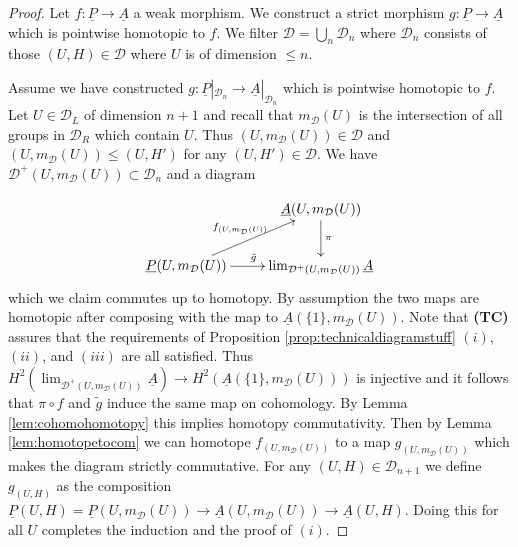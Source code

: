 \documentclass[12pt,a4paper]{article}
\theoremstyle{definition}
\begin{document}
\begin{proof}
Let $f\colon \underline{P}\rightarrow \underline{A}$ a weak morphism. We construct a strict morphism $g\colon \underline{P}\rightarrow\underline{A}$ which is pointwise homotopic to $f$.
We filter $\mathcal{D}=\bigcup_n \mathcal{D}_n$ where $\mathcal{D}_n$ consists of those $(U,H)\in \mathcal{D}$ where $U$ is of dimension $\leq n$.

Assume we have constructed $g\colon\underline{P}|_{\mathcal{D}_n}\rightarrow \underline{A}|_{\mathcal{D}_n}$ which is pointwise homotopic to $f$. Let $U\in \mathcal{D}_L$ of dimension $n+1$ and recall that $m_\mathcal{D}(U)$ is the intersection of all groups in $\mathcal{D}_R$ which contain $U$. Thus $(U,m_\mathcal{D}(U))\in \mathcal{D}$ and $(U,m_\mathcal{D}(U))\leq (U,H')$ for any $(U,H')\in \mathcal{D}$. We have $\mathcal{D}^+(U,m_\mathcal{D}(U))\subset \mathcal{D}_n$
and a diagram

\[\xymatrix{
 & \underline{A}(U,m_\mathcal{D}(U))\ar[d]^\pi\\
 \underline{P}(U,m_\mathcal{D}(U))\ar[r]^{\tilde{g}}\ar[ur]^{f_{(U,m_\mathcal{D}(U))}}&\lim_{\mathcal{D}^+(U,m_\mathcal{D}(U))}\underline{A}
}\]
 which we claim commutes up to homotopy. By assumption the two maps are homotopic after composing with the map to $\underline{A}(\{1\},m_\mathcal{D}(U))$. Note that \textbf{(TC)} assures that the requirements of Proposition \ref{prop:technicaldiagramstuff} $(i)$, $(ii)$, and $(iii)$ are all satisfied. Thus $H^2(\lim_{\mathcal{D}^+(U,m_\mathcal{D}(U))}\underline{A})\rightarrow H^2(\underline{A}(\{1\},m_\mathcal{D}(U)))$ is injective and it follows that $\pi\circ f$ and $\tilde{g}$ induce the same map on cohomology. By Lemma \ref{lem:cohomohomotopy} this implies homotopy commutativity. Then by Lemma \ref{lem:homotopetocom} we can homotope $f_{(U,m_\mathcal{D}(U))}$ to a map $g_{(U,m_\mathcal{D}(U))}$ which makes the diagram strictly commutative. For any $(U,H)\in\mathcal{D}_{n+1}$ we define $g_{(U,H)}$ as the composition $\underline{P}(U,H)=\underline{P}(U,m_\mathcal{D}(U))\rightarrow \underline{A}(U,m_\mathcal{D}(U))\rightarrow \underline{A}(U,H)$. Doing this for all $U$ completes the induction and the proof of $(i)$.
 

\end{proof}
\end{document}
